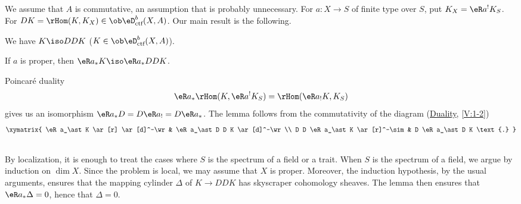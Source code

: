 \subsection{}\label{VII:4-2}

We assume that $A$ is commutative, an assumption that is probably
unnecessary. For $a:X\to S$ of finite type over $S$, put
$K_X=\eR a^! K_S$. For 
$D K=\rHom(K,K_X)\in\ob\eD_\text{ctf}^b(X,A)$. Our main result is the
following.





\begin{theorem_}\label{VII:4-3}
We have $K\iso D D K$ ($K\in \ob\eD_\textnormal{ctf}^b(X,A)$).
\end{theorem_}





\begin{lemma_}\label{VII:4-4}
If $a$ is proper, then $\eR a_\ast K \iso \eR a_\ast D D K$.
\end{lemma_}

Poincaré duality
\[
  \eR a_\ast \rHom(K,\eR a^! K_S) = \rHom(\eR a_! K,K_S) 
\]
gives us an isomorphism $\eR a_\ast D = D \eR a_! = D \eR a_\ast$. The lemma
follows from the commutativity of the diagram (\hyperref[V]{Duality},
\ref{V:1-2})
\[\xymatrix{
  \eR a_\ast K \ar[r] \ar[d]^-\wr 
    & \eR a_\ast D D K \ar[d]^-\wr \\
  D D \eR a_\ast K \ar[r]^-\sim 
    & D \eR a_\ast D K \text{.} 
}\]





\subsection{}\label{VII:4-5}

By localization, it is enough to treat the cases where $S$ is the spectrum
of a field or a trait. When $S$ is the spectrum of a field, we argue by
induction on $\dim X$. Since the problem is local, we may assume that $X$ is
proper. Moreover, the induction hypothesis, by the usual arguments, ensures
that the mapping cylinder $\Delta$ of $K\to D D K$ has skyscraper cohomology
sheaves. The lemma then ensures that $\eR a_\ast \Delta=0$, hence that
$\Delta=0$.





